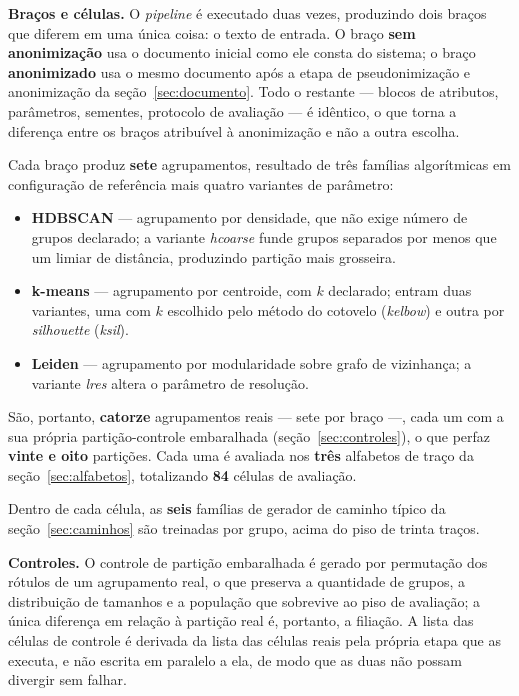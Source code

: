 \textbf{Braços e células.} O \emph{pipeline} é executado duas vezes, produzindo dois braços que
diferem em uma única coisa: o texto de entrada. O braço \textbf{sem anonimização} usa o documento
inicial como ele consta do sistema; o braço \textbf{anonimizado} usa o mesmo documento após a etapa de
pseudonimização e anonimização da seção~\ref{sec:documento}. Todo o restante --- blocos de atributos,
parâmetros, sementes, protocolo de avaliação --- é idêntico, o que torna a diferença entre os
braços atribuível à anonimização e não a outra escolha.

Cada braço produz \textbf{sete} agrupamentos, resultado de três famílias algorítmicas em
configuração de referência mais quatro variantes de parâmetro:

\begin{itemize}
  \item \textbf{HDBSCAN} --- agrupamento por densidade, que não exige número de grupos declarado; a
    variante \emph{hcoarse} funde grupos separados por menos que um limiar de distância, produzindo
    partição mais grosseira.
  \item \textbf{k-means} --- agrupamento por centroide, com $k$ declarado; entram duas variantes,
    uma com $k$ escolhido pelo método do cotovelo (\emph{kelbow}) e outra por \emph{silhouette}
    (\emph{ksil}).
  \item \textbf{Leiden} --- agrupamento por modularidade sobre grafo de vizinhança; a variante
    \emph{lres} altera o parâmetro de resolução.
\end{itemize}

\noindent São, portanto, \textbf{catorze} agrupamentos reais --- sete por braço ---, cada um com a
sua própria partição-controle embaralhada (seção~\ref{sec:controles}), o que perfaz \textbf{vinte e
oito} partições. Cada uma é avaliada nos \textbf{três} alfabetos de traço da
seção~\ref{sec:alfabetos}, totalizando \textbf{84} células de avaliação.

Dentro de cada célula, as \textbf{seis} famílias de gerador de caminho típico da
seção~\ref{sec:caminhos} são treinadas por grupo, acima do piso de trinta traços.

\textbf{Controles.} O controle de partição embaralhada é gerado por permutação dos rótulos de um
agrupamento real, o que preserva a quantidade de grupos, a distribuição de tamanhos e a população
que sobrevive ao piso de avaliação; a única diferença em relação à partição real é, portanto, a
filiação. A lista das células de controle é derivada da lista das células reais pela própria etapa
que as executa, e não escrita em paralelo a ela, de modo que as duas não possam divergir sem
falhar.

